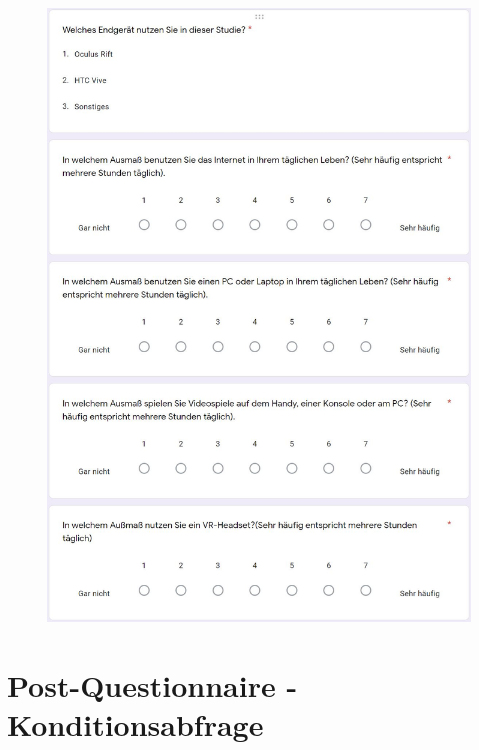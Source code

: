 \documentclass[a4paper,11pt]{article}%
\renewcommand{\\}{\vspace*{0.5\baselineskip} \newline}
\begin{document}
	\begin{figure}[H]
	\centering
		\begin{footnotesize}
			\includegraphics[scale=0.6]{Abbildungen/Fragebogen/Pre-Questionnaire/PQ6}\\
		\end{footnotesize}
	\end{figure}	
	
\section{Post-Questionnaire - Konditionsabfrage}
\label{Post-Questionnaire - Konditionsabfrage}
\end{document}
